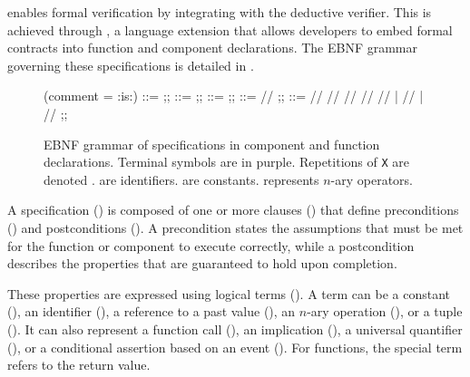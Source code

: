 \GRust enables formal verification by integrating with the \Creusot deductive verifier. This is
achieved through \GReusot, a language extension that allows developers to embed formal contracts
into \GRSync function and component declarations. The EBNF grammar governing these specifications is
detailed in .

\begin{figure}[!ht]
    \centering
    \begin{bnf}(comment = {:is:})
        \FunItem ::= \funItem[\Spec]{\ID}{\many{(\ID \: \kft{:} \: \TY)}}{\TY}{\many{\Decl}} ;;
        \CompItem ::= \compItem[\Spec]{\ID}{\many{(\ID \: \kft{:} \: \STY)}}
        {\many{(\ID \: \kft{:} \: \STY)}}{\many{\Eq}} ;;
        \Spec ::= \many{\Clause} ;;
        \Clause ::= \reqClause{\Term} // \ensClause{\Term} ;;
        \Term ::= \CST // \ID // \lastExpr{\ID} // \opExpr{\many{\Term}} // \tuple{\Term}
        // \appExpr{\ID}{\many{\Term}} | \implTerm{\Term}{\Term}
        // \forallTerm{\ID}{\TY}{\Term} | \whenTerm{\EPat}{\Term} // \resTerm ;;
    \end{bnf}
    \caption[EBNF grammar of \GReusot specifications.]{EBNF grammar of \GReusot specifications in component and function declarations.
        Terminal symbols are in purple. Repetitions of \texttt{X} are denoted .
        \ID are identifiers. \CST are constants. \OP represents $n$-ary operators.}
    \label{fig:syntax:greusot}
\end{figure}

A specification (\Spec) is composed of one or more clauses (\Clause) that define preconditions
() and postconditions (). A precondition states the assumptions that must
be met for the function or component to execute correctly, while a postcondition describes the
properties that are guaranteed to hold upon completion.

These properties are expressed using logical terms (\Term). A term can be a constant (\CST), an
identifier (\ID), a reference to a past value (\lastExpr{\ID}), an $n$-ary operation
(\opExpr{\many{\Term}}), or a tuple (\tuple{\Term}). It can also represent a function call
(\appExpr{\ID}{\many{\Term}}), an implication (\implTerm{\Term}{\Term}), a universal quantifier
(\forallTerm{\ID}{\TY}{\Term}), or a conditional assertion based on an event
(\whenTerm{\EPat}{\Term}). For functions, the special term \resTerm refers to the return value.

